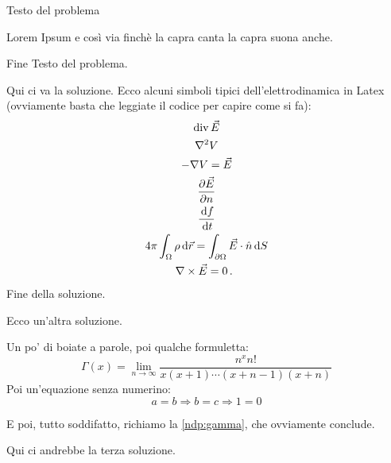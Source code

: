 \documentclass[../main.tex]{subfiles}
\begin{document}

\textex
Testo del problema

Lorem Ipsum e così via finchè la capra canta la capra suona anche.

Fine Testo del problema.

\solution
Qui ci va la soluzione.
Ecco alcuni simboli tipici dell'elettrodinamica in Latex (ovviamente basta che leggiate il codice per capire come si fa):
\begin{gather*}
	\operatorname{div}\vec E \\
	\nabla^2 V \\
	-\nabla V=\vec E \\
	\frac{\partial \vec E}{\partial n}\\
	\frac{\,\mathrm d f}{\,\mathrm d t}\\
	4\pi\int_{\Omega} \rho \,\mathrm d\vec r=\int_{\partial\Omega} \vec E\cdot\hat n\,\mathrm d S\\
	\nabla\times \vec E=0 \, \text{. }
\end{gather*}
Fine della soluzione.

\solution[2]
Ecco un'altra soluzione.

Un po' di boiate a parole, poi qualche formuletta:
\begin{equation}\label{ndp:gamma}
	\Gamma(x)=\lim_{n\to\infty} \dfrac{n^xn!}{x(x+1)\cdots (x+n-1)(x+n)}
\end{equation}
Poi un'equazione senza numerino:
\begin{equation*}
	a=b \Rightarrow b=c \Rightarrow 1=0
\end{equation*}

E poi, tutto soddifatto, richiamo la \cref{ndp:gamma}, che ovviamente conclude.

\solution[3]
Qui ci andrebbe la terza soluzione.
\end{document}
